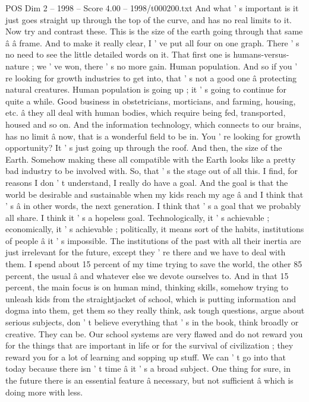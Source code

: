 \begin{textsample}{POS Dim 2 – 1998 – Score 4.00 – 1998/t000200.txt}
And what ' s important is it just goes straight up through the top of the curve, and has no real limits to it.
Now try and contrast these.
This is the size of the earth going through that same â â frame.
And to make it really clear, I ' ve put all four on one graph.
There ' s no need to see the little detailed words on it.
That first one is humans-versus-nature ; we ' ve won, there ' s no more gain.
Human population.
And so if you ' re looking for growth industries to get into, that ' s not a good one â protecting natural creatures.
Human population is going up ; it ' s going to continue for quite a while.
Good business in obstetricians, morticians, and farming, housing, etc. â they all deal with human bodies, which require being fed, transported, housed and so on.
And the information technology, which connects to our brains, has no limit â now, that is a wonderful field to be in.
You ' re looking for growth opportunity?
It ' s just going up through the roof.
And then, the size of the Earth.
Somehow making these all compatible with the Earth looks like a pretty bad industry to be involved with.
So, that ' s the stage out of all this.
I find, for reasons I don ' t understand, I really do have a goal.
And the goal is that the world be desirable and sustainable when my kids reach my age â and I think that ' s â in other words, the next generation.
I think that ' s a goal that we probably all share.
I think it ' s a hopeless goal.
Technologically, it ' s achievable ; economically, it ' s achievable ; politically, it means sort of the habits, institutions of people â it ' s impossible.
The institutions of the past with all their inertia are just irrelevant for the future, except they ' re there and we have to deal with them.
I spend about 15 percent of my time trying to save the world, the other 85 percent, the usual â and whatever else we devote ourselves to.
And in that 15 percent, the main focus is on human mind, thinking skills, somehow trying to unleash kids from the straightjacket of school, which is putting information and dogma into them, get them so they really think, ask tough questions, argue about serious subjects, don ' t believe everything that ' s in the book, think broadly or creative.
They can be.
Our school systems are very flawed and do not reward you for the things that are important in life or for the survival of civilization ; they reward you for a lot of learning and sopping up stuff.
We can ' t go into that today because there isn ' t time â it ' s a broad subject.
One thing for sure, in the future there is an essential feature â necessary, but not sufficient â which is doing more with less.

\end{textsample}
